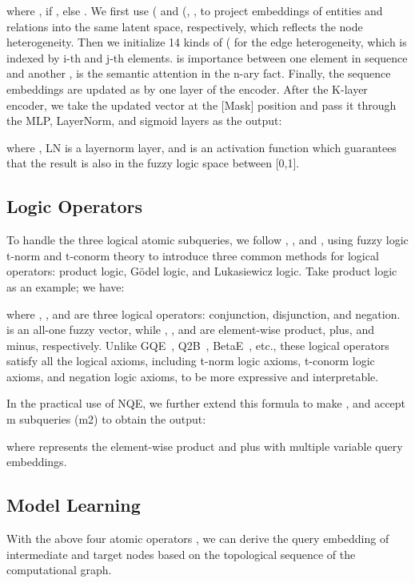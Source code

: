\documentclass[letterpaper]{article} \usepackage{aaai23}  \usepackage{times}  \usepackage{helvet}  \usepackage{courier}  \usepackage[hyphens]{url}  \usepackage{graphicx} \urlstyle{rm} \def\UrlFont{\rm}  \usepackage{natbib}  \usepackage{caption} \frenchspacing  \setlength{\pdfpagewidth}{8.5in}  \setlength{\pdfpageheight}{11in}  \usepackage{algorithm}
\begin{document}
where , if , else . We first use ( and (, ,  to project embeddings of entities and relations into the same latent space, respectively, which reflects the node heterogeneity. Then we initialize 14 kinds of ( for the edge heterogeneity, which is indexed by i-th and j-th elements.  is importance between one element in sequence  and another ,  is the semantic attention in the n-ary fact. Finally, the sequence embeddings are updated as  by one layer of the encoder. After the K-layer encoder, we take the updated vector at the [Mask] position  and pass it through the MLP, LayerNorm, and sigmoid layers as the output:

where , LN is a layernorm layer, and  is an activation function which guarantees that the result is also in the fuzzy logic space between [0,1].

\subsection{Logic Operators}

To handle the three logical atomic subqueries, we follow \citep{CQD}, \citep{FuzzQE}, and \citep{GNN-QE}, using fuzzy logic t-norm and t-conorm theory to introduce three common methods for logical operators: product logic, Gödel logic, and Lukasiewicz logic. Take product logic as an example; we have:

where , , and  are three logical operators: conjunction, disjunction, and negation.  is an all-one fuzzy vector, while , , and  are element-wise product, plus, and minus, respectively. Unlike GQE~\citep{GQE}, Q2B~\citep{Q2B}, BetaE~\citep{BetaE}, etc., these logical operators satisfy all the logical axioms, including t-norm logic axioms, t-conorm logic axioms, and negation logic axioms, to be more expressive and interpretable.

In the practical use of NQE, we further extend this formula to make , and  accept m subqueries (m2) to obtain the output:

where  represents the element-wise product and plus with multiple variable query embeddings.

\subsection{Model Learning}
\label{4.4}

With the above four atomic operators , we can derive the query embedding of intermediate and target nodes  based on the topological sequence of the computational graph. 
\end{document}
